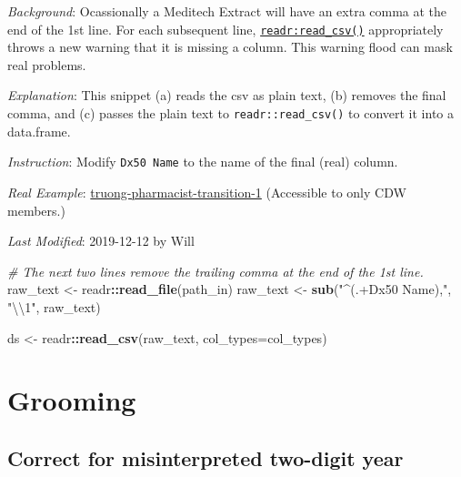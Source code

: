 \documentclass[
]{book}
\newenvironment{Shaded}{\begin{snugshade}}{\end{snugshade}}
\newcommand{\CharTok}[1]{\textcolor[rgb]{0.31,0.60,0.02}{#1}}
\newcommand{\CommentTok}[1]{\textcolor[rgb]{0.56,0.35,0.01}{\textit{#1}}}
\newcommand{\DataTypeTok}[1]{\textcolor[rgb]{0.13,0.29,0.53}{#1}}
\newcommand{\KeywordTok}[1]{\textcolor[rgb]{0.13,0.29,0.53}{\textbf{#1}}}
\newcommand{\NormalTok}[1]{#1}
\newcommand{\OperatorTok}[1]{\textcolor[rgb]{0.81,0.36,0.00}{\textbf{#1}}}
\newcommand{\StringTok}[1]{\textcolor[rgb]{0.31,0.60,0.02}{#1}}
\begin{document}
\emph{Background}: Ocassionally a Meditech Extract will have an extra comma at the end of the 1st line. For each subsequent line, \href{https://readr.tidyverse.org/reference/read_delim.html}{\texttt{readr:read\_csv()}} appropriately throws a new warning that it is missing a column. This warning flood can mask real problems.

\emph{Explanation}: This snippet (a) reads the csv as plain text, (b) removes the final comma, and (c) passes the plain text to \texttt{readr::read\_csv()} to convert it into a data.frame.

\emph{Instruction}: Modify \texttt{Dx50\ Name} to the name of the final (real) column.

\emph{Real Example}: \href{https://github.com/OuhscBbmc/truong-pharmacist-transition-1/blob/eec6d7eb8aaa9e3df52dafb826dbc53aaf515c63/manipulation/ellis/dx-ellis.R\#L158-L162}{truong-pharmacist-transition-1} (Accessible to only CDW members.)

\emph{Last Modified}: 2019-12-12 by Will

\begin{Shaded}
\begin{Highlighting}[]
\CommentTok{\# The next two lines remove the trailing comma at the end of the 1st line.}
\NormalTok{raw\_text  <{-}}\StringTok{ }\NormalTok{readr}\OperatorTok{::}\KeywordTok{read\_file}\NormalTok{(path\_in)}
\NormalTok{raw\_text  <{-}}\StringTok{ }\KeywordTok{sub}\NormalTok{(}\StringTok{"\^{}(.+Dx50 Name),"}\NormalTok{, }\StringTok{"}\CharTok{\textbackslash{}\textbackslash{}}\StringTok{1"}\NormalTok{, raw\_text)}

\NormalTok{ds        <{-}}\StringTok{ }\NormalTok{readr}\OperatorTok{::}\KeywordTok{read\_csv}\NormalTok{(raw\_text, }\DataTypeTok{col\_types=}\NormalTok{col\_types)}
\end{Highlighting}
\end{Shaded}

\hypertarget{grooming}{%
\section{Grooming}\label{grooming}}

\hypertarget{correct-for-misinterpreted-two-digit-year}{%
\subsection{Correct for misinterpreted two-digit year}\label{correct-for-misinterpreted-two-digit-year}}
\end{document}
